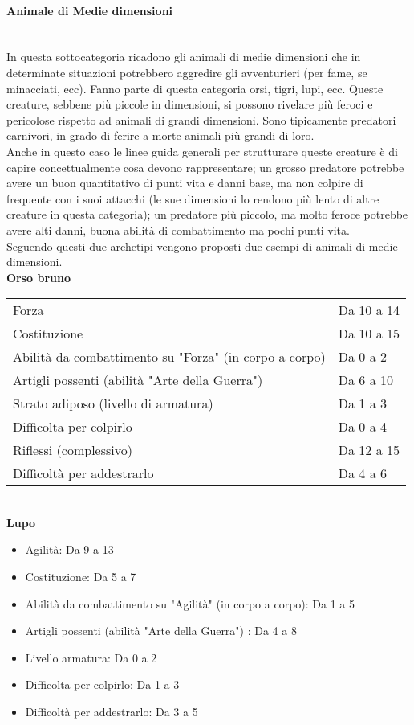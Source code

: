 \documentclass[../manuale_main.tex]{subfiles}
\begin{document}
\paragraph{Animale di Medie dimensioni}\mbox{}\\ 
In questa sottocategoria ricadono gli animali di medie dimensioni che in determinate situazioni potrebbero aggredire gli avventurieri (per fame, se minacciati, ecc). Fanno parte di questa categoria orsi, tigri, lupi, ecc. Queste creature, sebbene più piccole in dimensioni, si possono rivelare più feroci e pericolose rispetto ad animali di grandi dimensioni. Sono tipicamente predatori carnivori, in grado di ferire a morte animali più grandi di loro.\\
Anche in questo caso le linee guida generali per strutturare queste creature è di capire concettualmente cosa devono rappresentare; un grosso predatore potrebbe avere un buon quantitativo di punti vita e danni base, ma non colpire di frequente con i suoi attacchi (le sue dimensioni lo rendono più lento di altre creature in questa categoria); un predatore più piccolo, ma molto feroce potrebbe avere alti danni, buona abilità di combattimento ma pochi punti vita.\\
Seguendo questi due archetipi vengono proposti due esempi di animali di medie dimensioni.\\

\textbf{Orso bruno}\\
\begin{tabular}{l l}
Forza&Da 10 a 14\\
Costituzione&Da 10 a 15\\
Abilità da combattimento su "Forza" (in corpo a corpo)&Da 0 a 2\\
Artigli possenti (abilità "Arte della Guerra")&Da 6 a 10\\
Strato adiposo (livello di armatura)&Da 1 a 3\\
Difficolta per colpirlo&Da 0 a 4\\
Riflessi (complessivo)& Da 12 a 15\\
Difficoltà per addestrarlo&Da 4 a 6\\
\end{tabular}\\
\textbf{Lupo}
\begin{itemize}
\item Agilità: Da 9 a 13
\item Costituzione: Da 5 a 7
\item Abilità da combattimento su "Agilità" (in corpo a corpo): Da 1 a 5
\item Artigli possenti (abilità "Arte della Guerra") : Da 4 a 8
\item Livello armatura: Da 0 a 2
\item Difficolta per colpirlo: Da 1 a 3
\item Difficoltà per addestrarlo: Da 3 a 5
\end{itemize}
\end{document}
